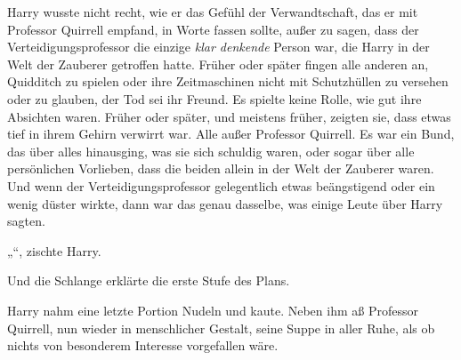 Harry wusste nicht recht, wie er das Gefühl der Verwandtschaft, das er mit Professor Quirrell empfand, in Worte fassen sollte, außer zu sagen, dass der Verteidigungsprofessor die einzige \emph{klar denkende} Person war, die Harry in der Welt der Zauberer getroffen hatte. Früher oder später fingen alle anderen an, Quidditch zu spielen oder ihre Zeitmaschinen nicht mit Schutzhüllen zu versehen oder zu glauben, der Tod sei ihr Freund. Es spielte keine Rolle, wie gut ihre Absichten waren. Früher oder später, und meistens früher, zeigten sie, dass etwas tief in ihrem Gehirn verwirrt war. Alle außer Professor Quirrell. Es war ein Bund, das über alles hinausging, was sie sich schuldig waren, oder sogar über alle persönlichen Vorlieben, dass die beiden allein in der Welt der Zauberer waren. Und wenn der Verteidigungsprofessor gelegentlich etwas beängstigend oder ein wenig düster wirkte, dann war das genau dasselbe, was einige Leute über Harry sagten.

„“, zischte Harry.

Und die Schlange erklärte die erste Stufe des Plans.

\later

Harry nahm eine letzte Portion Nudeln und kaute. Neben ihm aß Professor Quirrell, nun wieder in menschlicher Gestalt, seine Suppe in aller Ruhe, als ob nichts von besonderem Interesse vorgefallen wäre.

